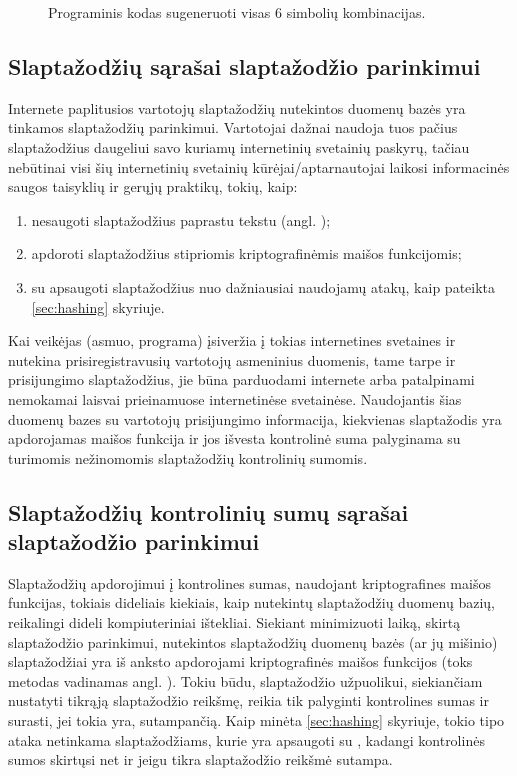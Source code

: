 \documentclass{VUMIFInfBakalaurinis}
\begin{document}
\begin{figure}
  \begin{center}
    
    \caption{Programinis kodas sugeneruoti visas 6 simbolių kombinacijas.}
    \label{fig:permutacijos}
  \end{center}
\end{figure}

\subsection{Slaptažodžių sąrašai slaptažodžio parinkimui} \label{sec:wordlists}
Internete paplitusios vartotojų slaptažodžių nutekintos duomenų bazės yra 
tinkamos slaptažodžių parinkimui. Vartotojai dažnai naudoja tuos pačius 
slaptažodžius daugeliui savo kuriamų internetinių svetainių paskyrų, tačiau 
nebūtinai visi šių internetinių svetainių kūrėjai/aptarnautojai laikosi
informacinės saugos taisyklių ir gerųjų praktikų, tokių, kaip:
\begin{enumerate}
  \item nesaugoti slaptažodžius paprastu tekstu (angl. );
  \item apdoroti slaptažodžius stipriomis kriptografinėmis maišos funkcijomis;
  \item su  apsaugoti slaptažodžius nuo dažniausiai naudojamų 
        atakų, kaip pateikta \ref{sec:hashing} skyriuje.
\end{enumerate}

Kai veikėjas (asmuo, programa) įsiveržia į tokias internetines svetaines ir 
nutekina prisiregistravusių vartotojų asmeninius duomenis, tame tarpe ir 
prisijungimo slaptažodžius, jie būna parduodami internete arba patalpinami 
nemokamai laisvai prieinamuose internetinėse svetainėse.
Naudojantis šias duomenų bazes su vartotojų prisijungimo informacija, kiekvienas 
slaptažodis yra apdorojamas maišos funkcija ir jos išvesta kontrolinė suma 
palyginama su turimomis nežinomomis slaptažodžių kontrolinių sumomis.

\subsection{Slaptažodžių kontrolinių sumų sąrašai slaptažodžio parinkimui} 
\label{sec:rainbowtables}
Slaptažodžių apdorojimui į kontrolines sumas, naudojant kriptografines maišos 
funkcijas, tokiais dideliais kiekiais, kaip nutekintų slaptažodžių duomenų 
bazių, reikalingi dideli kompiuteriniai ištekliai. Siekiant minimizuoti laiką, 
skirtą slaptažodžio parinkimui, nutekintos slaptažodžių duomenų bazės (ar jų 
mišinio) slaptažodžiai yra iš anksto apdorojami kriptografinės maišos funkcijos 
(toks metodas vadinamas angl. ). Tokiu būdu, 
slaptažodžio užpuolikui, siekiančiam nustatyti tikrąją slaptažodžio reikšmę, 
reikia tik palyginti kontrolines sumas ir surasti, jei tokia yra, sutampančią. 
Kaip minėta \ref{sec:hashing} skyriuje, tokio tipo ataka netinkama 
slaptažodžiams, kurie yra apsaugoti su , kadangi kontrolinės 
sumos skirtųsi net ir jeigu tikra slaptažodžio reikšmė sutampa.
\end{document}
